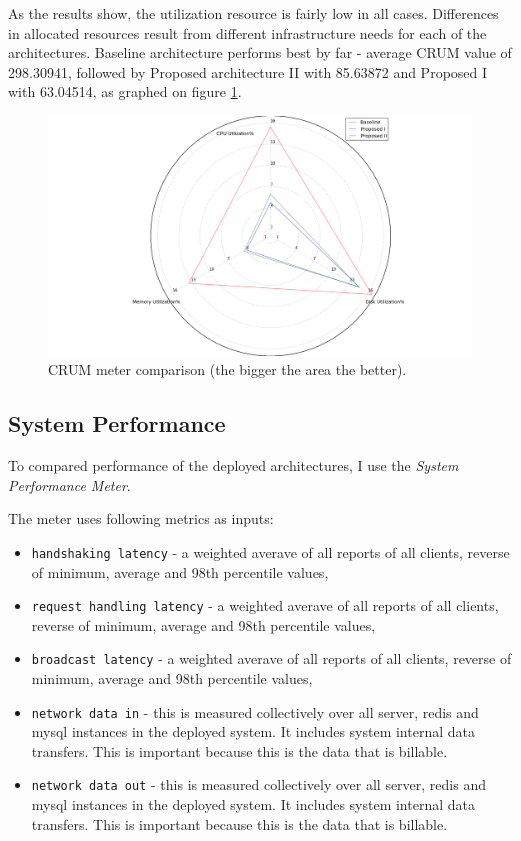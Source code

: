 \documentclass{uvamscse}
\begin{document}
As the results show, the utilization resource is fairly low in all cases. Differences in allocated resources result from different infrastructure needs for each of the architectures. Baseline architecture performs best by far - average CRUM value of 298.30941, followed by Proposed architecture II with 85.63872 and Proposed I with 63.04514, as graphed on figure \ref{figure:crum}.

\begin{figure}[H]
\centering
\includegraphics[scale=0.3]{crum}
\caption{CRUM meter comparison (the bigger the area the better).}
\label{figure:crum}
\end{figure}

\subsection{System Performance}
To compared performance of the deployed architectures, I use the \textit{System Performance Meter}.

The meter uses following metrics as inputs:
\begin{itemize}
  \item \texttt{handshaking latency} - a weighted averave of all reports of all clients, reverse of minimum, average and 98th percentile values,
  \item \texttt{request handling latency} - a weighted averave of all reports of all clients, reverse of minimum, average and 98th percentile values,
  \item \texttt{broadcast latency} - a weighted averave of all reports of all clients, reverse of minimum, average and 98th percentile values,
  \item \texttt{network data in} - this is measured collectively over all server, redis and mysql instances in the deployed system. It includes system internal data transfers. This is important because this is the data that is billable.
  \item \texttt{network data out} - this is measured collectively over all server, redis and mysql instances in the deployed system. It includes system internal data transfers. This is important because this is the data that is billable.
\end{itemize}
\end{document}
